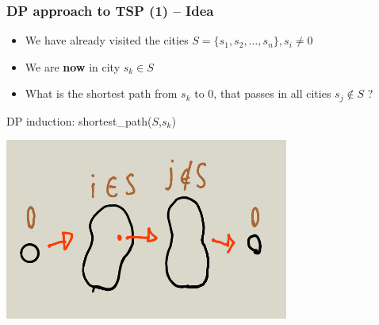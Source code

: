\documentclass{beamer}
\begin{document}
\begin{frame}
  \frametitle{DP approach to TSP (1) -- Idea}

  {\smaller
    \begin{block}{}
      \begin{itemize}
      \item We have already visited the cities $S = \{s_1,s_2,\ldots,s_n\}, s_i \neq 0$
      \item We are {\bf now} in city $s_k \in S$
      \item What is the shortest path from $s_k$ to $0$, that passes in all cities $s_j \notin S$ ?
      \end{itemize}

      DP induction: shortest\_path($S$,$s_k$)
    \end{block}
    \begin{center}
      \includegraphics[width=0.7\textwidth]{img/DP_TSP}
    \end{center}
  }
\end{frame}
\end{document}
